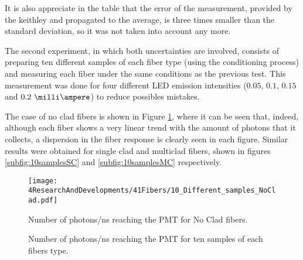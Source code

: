 It is also appreciate in the table that the error of the measurement, provided by the keithley and propagated to the average, is three times smaller than the standard deviation, so it was not taken into account any more.


The second experiment, in which both uncertainties are involved, consists of preparing ten different samples of each fiber type (using the conditioning process) and measuring each fiber under the same conditions as the previous test. This measurement was done for four different LED emission intensities ($0.05$, $0.1$, $0.15$ and $0.2~\milli\ampere$) to reduce possibles mistakes.

The case of no clad fibers is shown in Figure \ref{fig:10samplesNC}, where it can be seen that, indeed, although each fiber shows a very linear trend with the amount of photons that it collects, a dispersion in the fiber response is clearly seen in each figure. Similar results were obtained for single clad and multiclad fibers, shown in figures \ref{subfig:10samplesSC} and \ref{subfig:10samplesMC} respectively.

\begin{figure}[h]
\centering
\texttt{[image: 4ResearchAndDevelopments/41Fibers/10\_Different\_samples\_NoClad.pdf]}
\caption{Number of photons/ns reaching the PMT for No Clad fibers.\label{fig:10samplesNC}}
\end{figure}

\begin{figure}[htbp]
 \centering
    \newline
 \caption{Number of photons/ns reaching the PMT for ten samples of each fibers type.}
 \label{fig:10samplesThreeTypes}
\end{figure}

